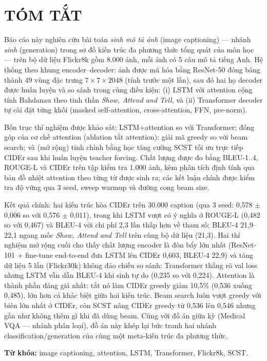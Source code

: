\chapter*{TÓM TẮT}

Báo cáo này nghiên cứu bài toán \emph{sinh mô tả ảnh} (image captioning) --- nhánh
\emph{sinh} (generation) trong sơ đồ kiến trúc đa phương thức tổng quát của môn học ---
trên bộ dữ liệu Flickr8k gồm 8.000 ảnh, mỗi ảnh có 5 câu mô tả tiếng Anh.
Hệ thống theo khung encoder--decoder: ảnh được mã hóa bằng ResNet-50 đóng băng
thành 49 vùng đặc trưng $7\times 7\times 2048$ (tính trước một lần), sau đó hai họ
decoder được huấn luyện và so sánh trong cùng điều kiện: (i) LSTM với attention
cộng tính Bahdanau theo tinh thần \emph{Show, Attend and Tell}, và (ii) Transformer
decoder tự cài đặt từng khối (masked self-attention, cross-attention, FFN, pre-norm).

Bốn trục thí nghiệm được khảo sát: LSTM+attention so với Transformer; đóng góp
của cơ chế attention (ablation tắt attention); giải mã greedy so với beam search;
và (mở rộng) tinh chỉnh bằng học tăng cường SCST tối ưu trực tiếp CIDEr sau khi
huấn luyện teacher forcing. Chất lượng được đo bằng BLEU-1..4, ROUGE-L và CIDEr
trên tập kiểm tra 1.000 ảnh, kèm phân tích định tính qua bản đồ nhiệt attention
theo từng từ được sinh ra; các kết luận chính được kiểm tra độ vững qua 3 seed,
sweep warmup và đường cong beam size.

Kết quả chính: hai kiến trúc hòa CIDEr trên 30.000 caption (qua 3 seed: 0,578
$\pm$ 0,006 so với 0,576 $\pm$ 0,011), trong khi LSTM vượt có ý nghĩa ở ROUGE-L
(0,482 so với 0,467) và BLEU-4 với chi phí 2,3 lần thấp hơn về tham số; BLEU-4
21,9--22,1 ngang mốc \emph{Show, Attend and Tell} trên cùng bộ dữ liệu (21,3).
Hai thí nghiệm mở rộng cuối cho thấy chất lượng encoder là đòn bẩy lớn nhất
(ResNet-101 + fine-tune end-to-end đưa LSTM lên CIDEr 0,603, BLEU-4 22,9) và
tăng dữ liệu 5 lần (Flickr30k) không đảo chiều so sánh: Transformer thắng rõ
val loss nhưng LSTM vẫn dẫn BLEU-4 khi sinh tự do (0,235 so với 0,224). Attention là thành phần đáng giá nhất: tắt nó
làm CIDEr greedy giảm 10,5\% (0,536 xuống 0,485), lớn hơn cả khác biệt giữa hai
kiến trúc. Beam search luôn vượt greedy với biên lớn nhất ở CIDEr, còn SCST nâng
CIDEr greedy từ 0,536 lên 0,546 nhưng gần như không thêm gì khi đã dùng beam.
Cùng với đồ án giữa kỳ (Medical VQA --- nhánh
phân loại), đồ án này khép lại bức tranh hai nhánh classification/generation
của cùng một meta-kiến trúc đa phương thức.

\textbf{Từ khóa:} image captioning, attention, LSTM, Transformer, Flickr8k, SCST.
\clearpage
